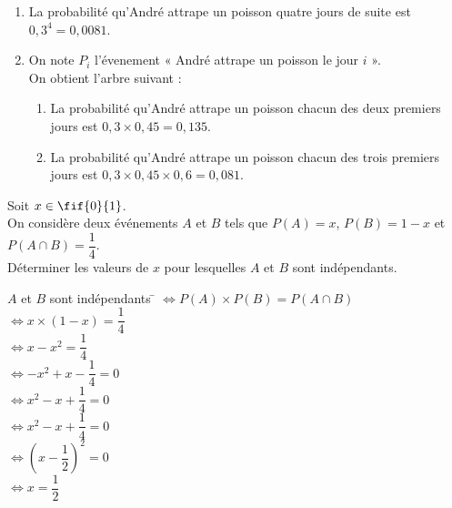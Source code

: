 \documentclass[a4paper,11pt,exos]{nsi} %
\begin{document}
\begin{enumerate}
    \item La probabilité qu'André attrape un poisson quatre jours de suite est $0,3^4=0,0081$.
    \item On note $P_i$ l'évenement « André attrape un poisson le jour $i$ ».\\
    On obtient l'arbre suivant :
    \def\abun{$P_1$}
\def\alun{0,3}
\def\abdeux{$\barmaj{P_1}$}
\def\aldeux{0,7}
\def\abtrois{$P_2$}
\def\altrois{0,45}
\def\abquatre{$\barmaj{P_2}$}
\def\alquatre{0,55}
\def\abcinq{$P_2$}
\def\alcinq{0,8}
\def\absix{$\barmaj{P_2}$}
\def\alsix{0,2}
\begin{center}
\arbreproba
\end{center}

    \begin{enumerate}[label=\textbullet]
        \item 
        La probabilité qu'André attrape un poisson chacun des deux premiers jours est $0,3\times 0,45=0,135$.
        \item La probabilité qu'André attrape un poisson chacun des trois premiers jours est $0,3\times 0,45\times 0,6=0,081$.
    \end{enumerate}
\end{enumerate}

\exo{}
\textcolor{UGLiBlue}{Soit $x\in\fif{0}{1}$.\\
On considère deux événements $A$ et $B$ tels que $P(A)=x$, $P(B)=1-x$ et $P(A\cap B)=\dfrac{1}{4}$.\\
Déterminer les valeurs de $x$ pour lesquelles $A$ et $B$ sont indépendants.}

\begin{tabbing}
    $A$ et $B$ sont indépendants \= $\iff P(A)\times P(B)=P(A\cap B)$\\[.5em]
                                \> $\iff x\times (1-x)=\dfrac{1}{4}$\\[.5em]
                                \> $\iff x-x^2=\dfrac{1}{4}$\\[.5em]
                                \> $\iff -x^2+x-\dfrac{1}{4}=0$\\[.5em]
                                \> $\iff x^2-x+\dfrac{1}{4}=0$\\[.5em]
                                \> $\iff x^2-x+\dfrac{1}{4}=0$\\[.5em]
                                \> $\iff (x-\dfrac{1}{2})^2=0$\\[.5em]
                                \> $\iff x=\dfrac{1}{2}$
\end{tabbing}
\end{document}

